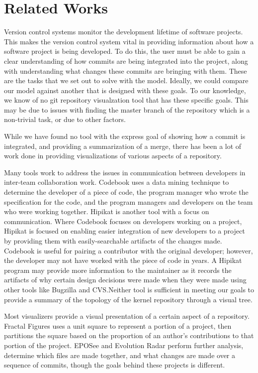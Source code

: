 
\section{Related Works}
\label{sec:related_works}

Version control systems monitor the development lifetime of software
projects. This makes the version control system vital in providing
information about how a software project is being developed. To do this,
the user must be able to gain a clear understanding of how commits are
being integrated into the project, along with understanding what changes
these commits are bringing with them. These are the tasks that we set
out to solve with the \mt model. Ideally, we could compare our model
against another that is designed with these goals. To our knowledge, we
know of no git repository visualzation tool that has these specific
goals. This may be due to issues with finding the master branch of the
repository which is a non-trivial task, or due to other factors.

While we have found no tool with the express goal of showing how a
commit is integrated, and providing a summarization of a merge, there
has been a lot of work done in providing visualizations of various
aspects of a repository.

Many tools work to address the issues in communication between
developers in inter-team collaboration work. Codebook\cite{Begel2010}
uses a data mining technique to determine the developer of a piece of
code, the program manager who wrote the specification for the code, and
the program managers and developers on the team who were working
together. Hipikat\cite{Cubranic2005} is another tool with a focus on
communication. Where Codebook focuses on developers working on a
project, Hipikat is focused on enabling easier integration of new
developers to a project by providing them with easily-searchable
artifacts of the changes made. Codebook is useful for pairing a
contributor with the original developer; however, the developer may not
have worked with the piece of code in years. A Hipikat program may
provide more information to the maintainer as it records the artifacts
of why certain design decisions were made when they were made using
other tools like Bugzilla and CVS.\@ Neither tool is sufficient in
meeting our goals to provide a summary of the topology of the kernel
repository through a visual tree.

Most visualizers provide a visual presentation of a certain aspect of a
repository. Fractal Figures\cite{Ambros2005} uses a unit square to
represent a portion of a project, then partitions the square based on
the proportion of an author's contributions to that portion of the
project. EPOSee\cite{Burch2005} and Evolution Radar\cite{Ambros2009}
perform further analysis, determine which files are made together, and
what changes are made over a sequence of commits, though the goals
behind these projects is different.

